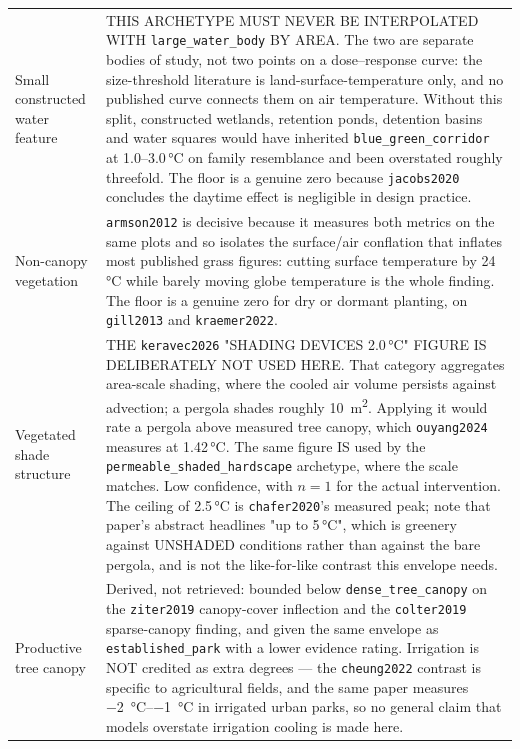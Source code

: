 \begin{longtable}{@{}>{\raggedright\arraybackslash}p{30mm}
                    >{\raggedright\arraybackslash}p{95mm}@{}}
\addlinespace
Small constructed water feature &
THIS ARCHETYPE MUST NEVER BE INTERPOLATED WITH \texttt{large\_water\_body} BY AREA. The two are separate bodies of study, not two points on a dose--response curve: the size-threshold literature is land-surface-temperature only, and no published curve connects them on air temperature. Without this split, constructed wetlands, retention ponds, detention basins and water squares would have inherited \texttt{blue\_green\_corridor} at 1.0--3.0\,\si{\degreeCelsius} on family resemblance and been overstated roughly threefold. The floor is a genuine zero because \texttt{jacobs2020} concludes the daytime effect is negligible in design practice. \\
\addlinespace
Non-canopy vegetation &
\texttt{armson2012} is decisive because it measures both metrics on the same plots and so isolates the surface/air conflation that inflates most published grass figures: cutting surface temperature by 24\,\si{\degreeCelsius} while barely moving globe temperature is the whole finding. The floor is a genuine zero for dry or dormant planting, on \texttt{gill2013} and \texttt{kraemer2022}. \\
\addlinespace
Vegetated shade structure &
THE \texttt{keravec2026} "SHADING DEVICES 2.0\,\si{\degreeCelsius}" FIGURE IS DELIBERATELY NOT USED HERE. That category aggregates area-scale shading, where the cooled air volume persists against advection; a pergola shades roughly \qty{10}{\metre\squared}. Applying it would rate a pergola above measured tree canopy, which \texttt{ouyang2024} measures at 1.42\,\si{\degreeCelsius}. The same figure IS used by the \texttt{permeable\_shaded\_hardscape} archetype, where the scale matches. Low confidence, with $n=1$ for the actual intervention. The ceiling of 2.5\,\si{\degreeCelsius} is \texttt{chafer2020}'s measured peak; note that paper's abstract headlines "up to 5\,\si{\degreeCelsius}", which is greenery against UNSHADED conditions rather than against the bare pergola, and is not the like-for-like contrast this envelope needs. \\
\addlinespace
Productive tree canopy &
Derived, not retrieved: bounded below \texttt{dense\_tree\_canopy} on the \texttt{ziter2019} canopy-cover inflection and the \texttt{colter2019} sparse-canopy finding, and given the same envelope as \texttt{established\_park} with a lower evidence rating. Irrigation is NOT credited as extra degrees --- the \texttt{cheung2022} contrast is specific to agricultural fields, and the same paper measures \SIrange{-2}{-1}{\degreeCelsius} in irrigated urban parks, so no general claim that models overstate irrigation cooling is made here. \\

\end{longtable}
